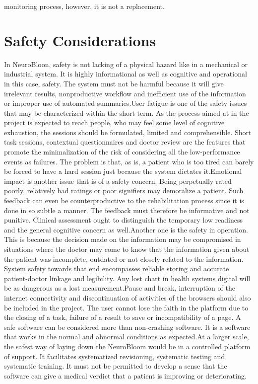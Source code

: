 \documentclass[12pt,a4paper]{report}
\begin{document}
monitoring process, however, it is not a replacement.

\section{Safety Considerations}
In NeuroBloon, safety is not lacking of a physical hazard like in a mechanical or industrial system. It is highly informational as well as cognitive and operational in this case, safety. The system must not be harmful because it will give irrelevant results, nonproductive workflow and inefficient use of the information or improper use of automated summaries.User fatigue is one of the safety issues that may be characterized within the short-term. As the process aimed at in the project is expected to reach people, who may feel some level of cognitive exhaustion, the sessions should be formulated, limited and comprehensible. Short task sessions, contextual questionnaires and doctor review are the features that promote the minimalization of the risk of considering all the low-performance events as failures. The problem is that, as is, a patient who is too tired can barely be forced to have a hard session just because the system dictates it.Emotional impact is another issue that is of a safety concern. Being perpetually rated poorly, relatively bad ratings or poor signifiers may demoralize a patient. Such feedback can even be counterproductive to the rehabilitation process since it is done in so subtle a manner. The feedback must therefore be informative and not punitive. Clinical assessment ought to distinguish the temporary low readiness and the general cognitive concern as well.Another one is the safety in operation. This is because the decision made on the information may be compromised in situations where the doctor may come to know that the information given about the patient was incomplete, outdated or not closely related to the information. System safety towards that end encompasses reliable storing and accurate patient-doctor linkage and legibility. Any lost chart in health systems digital will be as dangerous as a lost measurement.Pause and break, interruption of the internet connectivity and discontinuation of activities of the browsers should also be included in the project. The user cannot lose the faith in the platform due to the closing of a task, failure of a result to save or incompatibility of a page. A safe software can be considered more than non-crashing software. It is a software that works in the normal and abnormal conditions as expected.At a larger scale, the safest way of laying down the NeuroBloom would be in a controlled platform of support. It facilitates systematized revisioning, systematic testing and systematic training. It must not be permitted to develop a sense that the software can give a medical verdict that a patient is improving or deteriorating.
\end{document}
